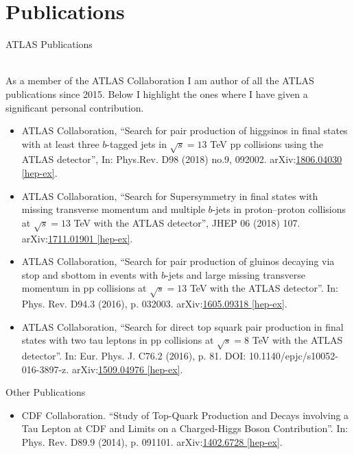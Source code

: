 \documentclass[11pt,a4paper]{moderncv}
\begin{document}
\section{Publications}
\color{color1}\begin{large}ATLAS Publications\end{large}\\ \color{black}
As a member of the ATLAS Collaboration I am author of all the ATLAS publications since 2015. Below I highlight the ones where I have given a significant personal contribution.
\begin{itemize} 
\item  ATLAS Collaboration, ``Search for pair production of higgsinos in final states with at least three $b$-tagged jets in $\sqrt{s} = 13$ TeV pp collisions using the ATLAS detector'',  In: Phys.Rev. D98 (2018) no.9, 092002. 
arXiv:\href{https://arxiv.org/abs/1806.04030}{\color{color1}1806.04030 [hep-ex]}.
\item  ATLAS Collaboration, ``Search for Supersymmetry in final states with missing transverse momentum and multiple $b$-jets in proton–proton collisions at $\sqrt{s} = 13$ TeV with the ATLAS detector'', JHEP 06 (2018) 107. arXiv:\href{https://arxiv.org/abs/1711.01901}{\color{color1}1711.01901 [hep-ex]}.
\item ATLAS Collaboration, ``Search for pair production of gluinos decaying via stop and sbottom in events with $b$-jets and large missing transverse momentum in pp collisions at $\sqrt{s} = 13$ TeV with the ATLAS detector''. In: Phys. Rev. D94.3 (2016), p. 032003. arXiv:\href{https://arxiv.org/abs/1605.09318}{\color{color1}1605.09318 [hep-ex]}.
\item ATLAS Collaboration, ``Search for direct top squark pair production in final states with two tau leptons in pp collisions at $\sqrt{s} = 8$ TeV with the ATLAS detector''. In: Eur. Phys. J. C76.2 (2016), p. 81. DOI: 10.1140/epjc/s10052-016-3897-z. arXiv:\href{https://arxiv.org/abs/1509.04976}{\color{color1}1509.04976 [hep-ex]}.
\end{itemize}
\par\medskip
\color{color1}\begin{large}Other Publications\end{large}\color{black}
\begin{itemize} 
\item CDF Collaboration. ``Study of Top-Quark Production and Decays involving a Tau Lepton at CDF and Limits on a Charged-Higgs Boson Contribution''. In: Phys. Rev. D89.9 (2014), p. 091101. arXiv:\href{https://arxiv.org/abs/1402.6728}{\color{color1}1402.6728 [hep-ex]}.
\end{itemize}
\end{document}
